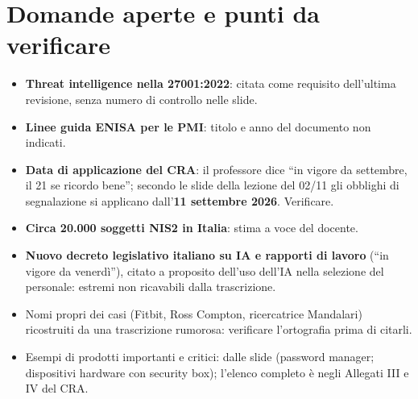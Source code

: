 \section{Domande aperte e punti da verificare}
\begin{verifica}
\begin{itemize}
  \item \textbf{Threat intelligence nella 27001:2022}: citata come requisito dell'ultima revisione, senza
    numero di controllo nelle slide.
  \item \textbf{Linee guida ENISA per le PMI}: titolo e anno del documento non indicati.
  \item \textbf{Data di applicazione del CRA}: il professore dice ``in vigore da settembre, il 21 se ricordo
    bene''; secondo le slide della lezione del 02/11 gli obblighi di segnalazione si applicano
    dall'\textbf{11 settembre 2026}. Verificare.
  \item \textbf{Circa 20.000 soggetti NIS2 in Italia}: stima a voce del docente.
  \item \textbf{Nuovo decreto legislativo italiano su IA e rapporti di lavoro} (``in vigore da venerdì''),
    citato a proposito dell'uso dell'IA nella selezione del personale: estremi non ricavabili dalla
    trascrizione.
  \item Nomi propri dei casi (Fitbit, Ross Compton, ricercatrice Mandalari) ricostruiti da una trascrizione
    rumorosa: verificare l'ortografia prima di citarli.
  \item Esempi di prodotti importanti e critici: dalle slide (password manager; dispositivi hardware con
    security box); l'elenco completo è negli Allegati III e IV del CRA.
\end{itemize}
\end{verifica}
